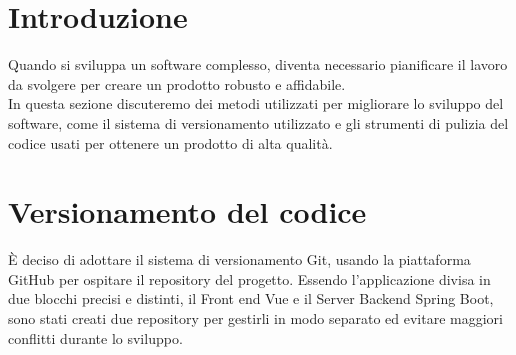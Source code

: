 \section{Introduzione}
Quando si sviluppa un software complesso, diventa necessario pianificare il lavoro da svolgere per creare un prodotto robusto e affidabile.\\
In questa sezione discuteremo dei metodi utilizzati per migliorare lo sviluppo del software, come il sistema di versionamento utilizzato e gli strumenti di pulizia del codice usati per ottenere un prodotto di alta qualità.\\
\section{Versionamento del codice}
È deciso di adottare il sistema di versionamento Git, usando la piattaforma GitHub per ospitare il repository del progetto. Essendo l'applicazione divisa in due blocchi precisi e distinti, il Front end Vue e il Server Backend Spring Boot, sono stati creati due repository per gestirli in modo separato ed evitare maggiori conflitti durante lo sviluppo.\\
